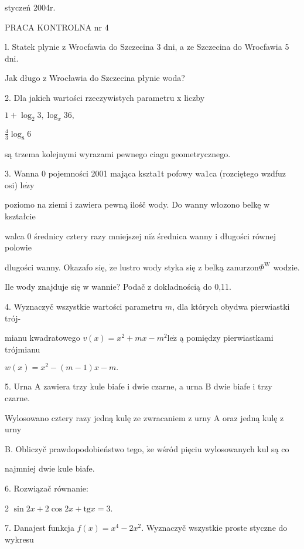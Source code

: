 \documentclass[a4paper,12pt]{article}
\begin{document}
styczeń 2004r.

PRACA KONTROLNA nr 4

l. Statek plynie z Wrocfawia do Szczecina 3 dni, a ze Szczecina do Wrocfawia 5 dni.

Jak długo z Wrocławia do Szczecina płynie woda?

2. Dla jakich wartości rzeczywistych parametru x liczby

$1+\log_{2}3, \log_{x}36,$

$\displaystyle \frac{4}{3}\log_{8}6$

są trzema kolejnymi wyrazami pewnego ciagu geometrycznego.

3. Wanna $0$ pojemności 2001 mająca kszta1t pofowy wa1ca (rozciętego wzdfuz osi) $\mathrm{l}\mathrm{e}\dot{\mathrm{z}}\mathrm{y}$

poziomo na ziemi $\mathrm{i}$ zawiera pewną ilośč wody. Do wanny włozono belkę $\mathrm{w}$ kształcie

walca $0$ średnicy cztery razy mniejszej $\mathrm{n}\mathrm{i}\dot{\mathrm{z}}$ średnica wanny $\mathrm{i}$ długości równej polowie

dlugości wanny. Okazafo się, $\dot{\mathrm{z}}\mathrm{e}$ lustro wody styka się $\mathrm{z}$ belką $\mathrm{z}\mathrm{a}\mathrm{n}\mathrm{u}\mathrm{r}\mathrm{z}\mathrm{o}\mathrm{n}\Phi^{\mathrm{W}}$ wodzie.

Ile wody znajduje się $\mathrm{w}$ wannie? Podač $\mathrm{z}$ dokładnością do 0,11.

4. Wyznaczyč wszystkie wartości parametru $m$, dla których obydwa pierwiastki trój-

mianu kwadratowego $v(x)=x^{2}+mx-m^{2}\mathrm{l}\mathrm{e}\dot{\mathrm{z}}$ ą pomiędzy pierwiastkami trójmianu

$w(x)=x^{2}-(m-1)x-m.$

5. Urna A zawiera trzy kule biafe $\mathrm{i}$ dwie czarne, a urna $\mathrm{B}$ dwie biafe $\mathrm{i}$ trzy czarne.

Wylosowano cztery razy jedną kulę ze zwracaniem $\mathrm{z}$ urny A oraz jedną kulę $\mathrm{z}$ urny

B. Obliczyč prawdopodobieństwo tego, $\dot{\mathrm{z}}\mathrm{e}$ wśród pięciu wylosowanych kul są co

najmniej dwie kule biafe.

6. Rozwiązač równanie:

2 $\sin 2x+2\cos 2x+\mathrm{t}\mathrm{g}x=3.$

7. Danajest funkcja $f(x)=x^{4}-2x^{2}$. Wyznaczyč wszystkie proste styczne do wykresu
\end{document}
